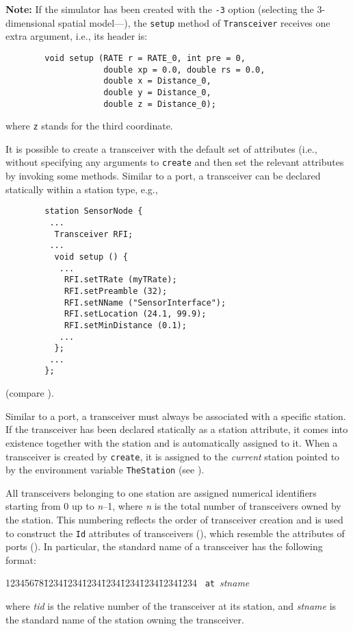 \medskip

\noindent
{\bf Note:}
If the simulator has been created with the {\tt -3} option (selecting the
3-dimensional spatial model---), the {\tt setup} method of
{\tt Transceiver} receives one extra argument, i.e., its header is:
\begin{verbatim}
        void setup (RATE r = RATE_0, int pre = 0,
                    double xp = 0.0, double rs = 0.0,
                    double x = Distance_0,
                    double y = Distance_0,
                    double z = Distance_0);
\end{verbatim}
\noindent
where {\tt z} stands for the third coordinate.

\medskip

It is possible to create a transceiver with the default set of attributes
(i.e., without specifying any arguments to {\tt create} and then set the
relevant attributes by invoking some methods.
Similar to a port, a transceiver can be declared statically within
a station type, e.g.,
\begin{verbatim}
        station SensorNode {
         ...
          Transceiver RFI;
         ...
          void setup () {
           ...
            RFI.setTRate (myTRate);
            RFI.setPreamble (32);
            RFI.setNName ("SensorInterface");
            RFI.setLocation (24.1, 99.9);
            RFI.setMinDistance (0.1);
           ...
          };
         ...
        };
\end{verbatim}
\noindent
(compare ).

Similar to a port, a transceiver must always be
associated with a specific station.
If the transceiver has been declared statically
as a station attribute,
it comes into existence together with the station and
is automatically assigned to it.
When a transceiver is created by {\tt create}, it is assigned to
the {\em current\/} station pointed to by the environment
variable {\tt TheStation} (see ).

All transceivers belonging to one station are assigned numerical identifiers
starting from 0 up to {\em n\/}--1, where {\em n\/} is the total number of
transceivers owned by the station.
This numbering reflects the order of transceiver creation
and is used to construct the
{\tt Id} attributes of transceivers (), which resemble
the attributes of ports ().
In particular, the standard name of a transceiver has the following format:
{\tt\begin{tabbing}
12345678\=1234\=1234\=1234\=1234\=1234\=1234\=1234\=1234\kill
{}~{\tt at}~{\em stname}
\end{tabbing}}
\noindent
where {\em tid\/} is the relative number of the transceiver at its station, and
{\em stname\/} is the standard name of the station owning the transceiver.

